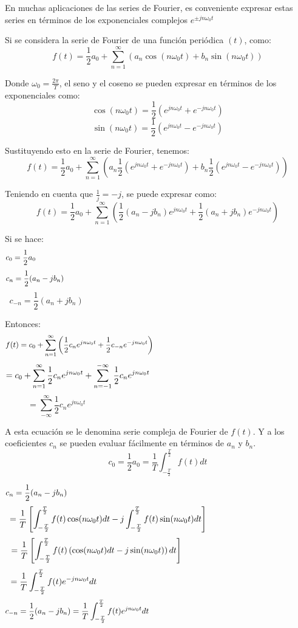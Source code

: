 \documentclass[a4paper]{article}
\begin{document}
{} En muchas aplicaciones de las series de Fourier, es conveniente expresar
estas series en t\'erminos de los exponenciales complejos $e^{\pm
jn\omega_{0}t}$ 

{} Si se considera la serie de Fourier de una funci\'on peri\'odica $(t)$,
como:  
\[
f(t)=\frac{1}{2}a_{0}+\sum_{n=1}^{\infty}\left(a_{n}\cos(n\omega_{0}t)+b_{n}%
\sin(n\omega_{0}t)\right)
\]

{} Donde $\omega_{0}=\frac{2\pi}{T}$, el seno y el coseno se pueden expresar
en t\'erminos de los exponenciales como:  
\[
\cos(n\omega_{0}t)=\frac{1}{2}\left(e^{jn\omega_{0}t}+e^{-jn\omega_{0}t}%
\right)
\]
\[
\sin(n\omega_{0}t)=\frac{1}{2}\left(e^{jn\omega_{0}t}-e^{-jn\omega_{0}t}%
\right)
\]

{} Sustituyendo esto en la serie de Fourier, tenemos:  
\[
f(t)=\frac{1}{2}a_{0}+\sum_{n=1}^{\infty}\left(a_{n}\frac{1}{2}%
\left(e^{jn\omega_{0}t}+e^{-jn\omega_{0}t}\right) +b_{n}\frac{1}{2}%
\left(e^{jn\omega_{0}t}-e^{-jn\omega_{0}t}\right)\right)
\]

{} Teniendo en cuenta que $\frac{1}{j}=-j$, se puede expresar como:  
\[
f(t)=\frac{1}{2}a_{0}+\sum_{n=1}^{\infty}\left(\frac{1}{2}%
\left(a_{n}-jb_{n}\right)e^{jn\omega_{0}t} +\frac{1}{2}\left(a_{n}+jb_{n}%
\right)e^{-jn\omega_{0}t}\right)
\]

{} Si se hace:  
\[
c_{0}=\frac{1}{2}a_{0} \hspace{12.6cm}
\]
\[
c_{n}=\frac{1}{2}(a_{n}-jb_{n}) \hspace{11.3cm}
\]
\[
c_{-n}=\frac{1}{2}(a_{n}+jb_{n}) \hspace{11cm}
\]

{} Entonces:  
\[
f(t)=c_{0}+\sum_{n=1}^{\infty}\left(\frac{1}{2}c_{n}e^{jn\omega_{0}t} +\frac{%
1}{2}c_{-n}e^{-jn\omega_{0}t}\right) \hspace{7.2cm}
\]
\[
=c_{0}+\sum_{n=1}^{\infty}\frac{1}{2}c_{n}e^{jn\omega_{0}t}+\sum_{n=-1}^{-%
\infty}\frac{1}{2}c_{n}e^{jn\omega_{0}t} \hspace{6.6cm}
\]
\[
=\sum_{-\infty}^{\infty}\frac{1}{2}c_{n}e^{jn\omega_{0}t} \hspace{10cm}
\]

{} A esta ecuaci\'on se le denomina serie compleja de Fourier de $f(t)$. Y a
los coeficientes $c_{n}$ se pueden evaluar f\'acilmente en t\'erminos de $%
a_{n}$ y $b_{n}.$  
\[
c_{0}=\frac{1}{2}a_{0}=\frac{1}{T}\int_{-\frac{T}{2}}^{\frac{T}{2}}f(t)dt
\]

\[
c_{n}=\frac{1}{2}(a_{n}-jb_{n}) \hspace{10.5cm}
\]
\[
=\frac{1}{T}\left[\int_{-\frac{T}{2}}^{\frac{T}{2}}f(t)\cos(n\omega_{0}t)dt
-j\int_{-\frac{T}{2}}^{\frac{T}{2}}f(t)\sin(n\omega_{0}t)dt\right] \hspace{%
4.1cm}
\]
\[
=\frac{1}{T}\left[\int_{-\frac{T}{2}}^{\frac{T}{2}}f(t)\left(\cos(n%
\omega_{0}t)dt -j\sin(n\omega_{0}t)\right)dt\right] \hspace{5.1cm}
\]
\[
=\frac{1}{T}\int_{-\frac{T}{2}}^{\frac{T}{2}}f(t)e^{-jn\omega_{0}t}dt 
\hspace{8.6cm}
\]
\[
c_{-n}=\frac{1}{2}(a_{n}-jb_{n})=\frac{1}{T}\int_{-\frac{T}{2}}^{\frac{T}{2}%
}f(t)e^{jn\omega_{0}t}dt \hspace{7.1cm}
\]
\end{document}
